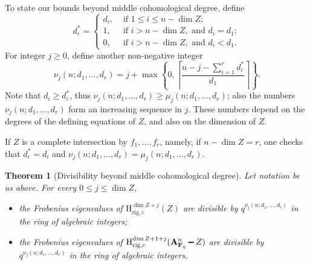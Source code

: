 \documentclass{amsart}
\numberwithin{equation}{section}
\theoremstyle{plain}
\newtheorem{theorem}[equation]{Theorem}
\theoremstyle{definition}
\renewcommand{\mathbb}{\mathbf}
\renewcommand{\setminus}{\mathbin{\rule[0.2em]{0.67em}{0.12em}}}%
\begin{document}
To state our bounds beyond middle cohomological degree, define
\begin{equation*}
  d_i^* =
  \begin{cases}
    d_i, & \text{ if }1\leq i \leq n-\dim Z; \\
    1, & \text{ if }i>n - \dim Z, \text{ and }d_i = d_1; \\
    0,& \text{ if }i> n-\dim Z, \text{ and }d_i < d_1.
  \end{cases}
\end{equation*}
For integer $j\geq 0$, define another non-negative integer
\begin{equation*}
  \nu_{j}(n;d_1,\ldots,d_r) = j + \max\left\{ 0, \left\lceil \frac{n-j-\sum_{i=1}^{r}d_{i}^{*}}{d_1}\right\rceil \right\}.
\end{equation*}
Note that \(d_{i} \geq d_{i}^{*}\), thus
\(\nu_j(n;d_1,\ldots,d_r) \geq \mu_j(n;d_1,\ldots,d_r)\);
also the numbers \(\nu_j(n;d_1,\ldots,d_r)\) form an increasing sequence in $j$.
These numbers depend on the degrees of the defining equations of \(Z\), and also on the dimension of \(Z\).

If \(Z\) is a complete intersection by \(f_{1},\ldots,f_{r}\),
namely, if $n-\dim Z=r$,
one checks that $d_i^*=d_i$ and \(\nu_j(n;d_1,\ldots,d_r) = \mu_j(n;d_1,\ldots,d_r)\).

\begin{theorem}[Divisibility beyond middle cohomological degree]
  \label{theorem:beyond-middle-dimension}
  Let notation be as above.
  For every \(0\leq j\leq \dim Z\),
  \begin{itemize}
  \item   the Frobenius eigenvalues of
    \(\mathrm{H}^{\dim Z+j}_{\mathrm{rig},c}(Z)\)  are divisible by
    \(q^{\nu_{j}(n;d_1,\ldots,d_r)}\) in the ring of algebraic integers;
  \item   the Frobenius eigenvalues of
    \(\mathrm{H}^{\dim Z+1+j}_{\mathrm{rig},c}(\mathbb{A}^n_{\mathbb{F}_q}\setminus Z)\)
    are divisible by
    \(q^{\nu_{j}(n;d_1,\ldots,d_r)}\) in the ring of algebraic integers.
  \end{itemize}
\end{theorem}
\end{document}
